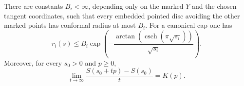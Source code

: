 \begin{lemma}\label{A2b-recession}
There are constants $B_i<\infty$, depending only on the marked $Y$ and
the chosen tangent coordinates, such that every embedded pointed disc
avoiding the other marked points has conformal radius at most $B_i$.
For a canonical cap one has
\begin{equation}\label{A2b-collar-bound}
 r_i(s)\leq B_i\exp\left(
   -\frac{\arctan(\operatorname{csch}(\pi\sqrt{s_i}))}{\sqrt{s_i}}
                         \right).
\end{equation}
Moreover, for every $s_0>0$ and $p\geq0$,
\begin{equation}\label{A2b-recession-formula}
 \lim_{t\to\infty}\frac{S(s_0+tp)-S(s_0)}t=K(p).
\end{equation}
\end{lemma}
